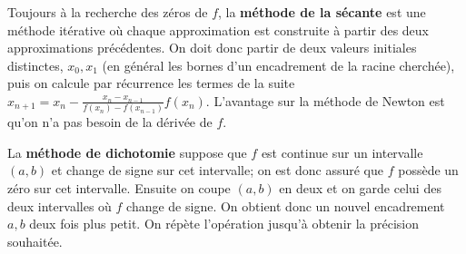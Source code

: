 \documentclass{exam}
\begin{document}
\begin{questions}
\question
Toujours à la recherche des zéros de $f$, la {\bf méthode de la sécante} est une méthode itérative où chaque approximation est construite à partir des deux approximations précédentes. On doit donc partir de deux valeurs initiales distinctes, $x_0, x_1$ (en général les bornes d'un encadrement de la racine cherchée), puis on calcule par récurrence les termes de la suite $x_{n+1} = x_n - \frac{x_n - x_{n-1}}{f(x_n) - f(x_{n-1})}f(x_n)$. L'avantage sur la méthode de Newton est qu'on n'a pas besoin de la dérivée de $f$.

\question
La {\bf méthode de dichotomie} suppose que $f$ est continue sur un intervalle $(a, b)$ et change de signe sur cet intervalle; on est donc assuré que $f$ possède un zéro sur cet intervalle. Ensuite on coupe $(a, b)$ en deux et on garde celui des deux intervalles où $f$ change de signe. On obtient donc un nouvel encadrement $a, b$ deux fois plus petit. On répète l'opération jusqu'à obtenir la précision souhaitée.
\end{questions}
\end{document}

